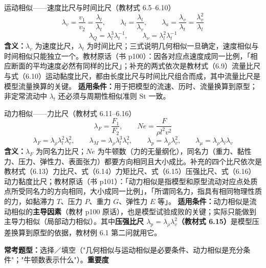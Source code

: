 \begin{gongshi}{运动相似——速度比尺与时间比尺（教材式 6.5--6.10）}
\[ \lambda_v=\frac{v_1}{v_2}=\frac{\lambda_l}{\lambda_t},\qquad \lambda_t=\frac{\lambda_l}{\lambda_v},\qquad \lambda_a=\frac{\lambda_v}{\lambda_t}=\frac{\lambda_v^{2}}{\lambda_l} \]
\[ \lambda_Q=\lambda_l^{3}\lambda_t^{-1},\qquad \lambda_\nu=\lambda_l^{2}\lambda_t^{-1} \]
\textbf{含义：}$\lambda_v$ 为速度比尺，$\lambda_t$ 为时间比尺；三式说明几何相似一旦确定，速度相似与时间相似只能独立一个。教材原话（书 p100）：因各对应点速度成同一比例，「相应断面的平均速度必然有同样的比尺」；补充的两式依次是教材式（6.9）流量比尺与式（6.10）运动黏度比尺，都由长度比尺与时间比尺组合而成，其中流量比尺是模型流量换算的关键。
\textbf{适用条件：}用于把模型的流速、历时、流量换算到原型；非定常流动中 $\lambda_t$ 还必须与周期性相似准则 $\mathrm{St}$ 一致。
\end{gongshi}

\begin{gongshi}{动力相似——力比尺（教材式 6.11--6.16）}
\[ \lambda_F=\frac{F_1}{F_2},\qquad Ne=\frac{F}{\rho l^{2}v^{2}} \]
\[ \lambda_F=\lambda_\rho\lambda_l^{2}\lambda_v^{2},\qquad \lambda_M=\lambda_\rho\lambda_l^{3}\lambda_v^{2},\qquad \lambda_p=\lambda_\rho\lambda_v^{2},\qquad \lambda_\mu=\lambda_\rho\lambda_l\lambda_v \]
\textbf{含义：}$\lambda_F$ 为同名力比尺；$Ne$ 为牛顿数（力的无量纲化），同名力（重力、黏性力、压力、弹性力、表面张力）都要方向相同且大小成比。补充的四个比尺依次是教材式（6.13）力比尺、式（6.14）力矩比尺、式（6.15）压强比尺、式（6.16）动力黏度比尺；教材原话（书 p101）：「动力相似是指模型和原型流动对应点处质点所受同名力的方向相同，大小成同一比例」，「所谓同名力，指具有相同物理性质的力，如黏滞力 $T$、压力 $P$、重力 $G$、弹性力 $E$ 等」。
\textbf{适用条件：}动力相似是流动相似的\textbf{主导因素}（教材 p100 原话），也是模型试验成败的关键；实际只能做到主导力相似（局部动力相似）。其中\textbf{压强比尺 $\lambda_p=\lambda_\rho\lambda_v^{2}$（教材式 6.15）}是模型压差换算到原型的依据，教材例 6.1 第二问就用它。
\end{gongshi}

\textbf{常考题型：}选择／填空（"几何相似与运动相似是必要条件、动力相似是充分条件"；"牛顿数表示什么"）。\quad\textbf{重要度 }\quad{}\quad{}

